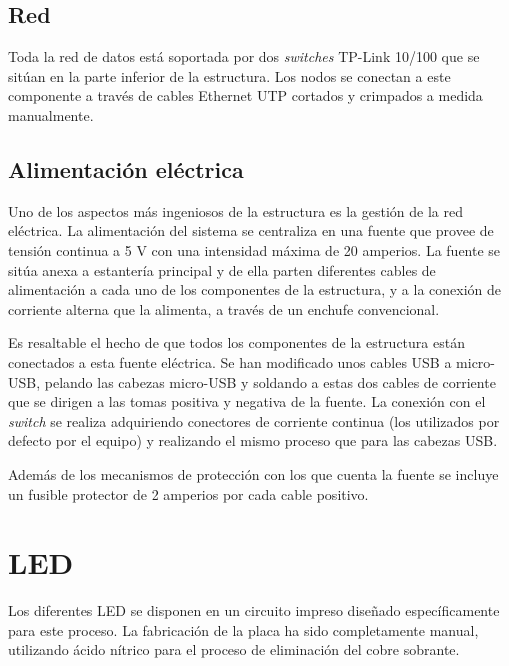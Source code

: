 \documentclass{article}
\begin{document}
\subsection{Red}

Toda la red de datos está soportada por dos \textit{switches} TP-Link 10/100 que se sitúan en la parte inferior de la estructura. Los nodos se conectan a este componente a través de cables Ethernet UTP cortados y crimpados a medida manualmente.

\subsection{Alimentación eléctrica}

Uno de los aspectos más ingeniosos de la estructura es la gestión de la red eléctrica. La alimentación del sistema se centraliza en una fuente que provee de tensión continua a 5 V con una intensidad máxima de 20 amperios. La fuente se sitúa anexa a estantería principal y de ella parten diferentes cables de alimentación a cada uno de los componentes de la estructura, y a la conexión de corriente alterna que la alimenta, a través de un enchufe convencional.

Es resaltable el hecho de que todos los componentes de la estructura están conectados a esta fuente eléctrica. Se han modificado unos cables USB a micro-USB, pelando las cabezas micro-USB y soldando a estas dos cables de corriente que se dirigen a las tomas positiva y negativa de la fuente. La conexión con el \textit{switch} se realiza adquiriendo conectores de corriente continua (los utilizados por defecto por el equipo) y realizando el mismo proceso que para las cabezas USB.


Además de los mecanismos de protección con los que cuenta la fuente se incluye un fusible protector de 2 amperios por cada cable positivo.

\section{LED}

Los diferentes LED se disponen en un circuito impreso diseñado específicamente para este proceso. La fabricación de la placa ha sido completamente manual, utilizando ácido nítrico para el proceso de eliminación del cobre sobrante.
\end{document}
